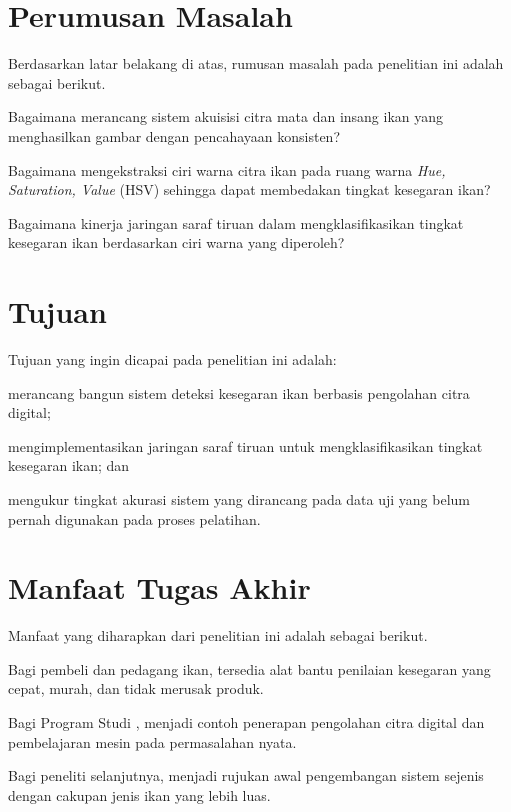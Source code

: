 \section{Perumusan Masalah}

Berdasarkan latar belakang di atas, rumusan masalah pada penelitian ini
adalah sebagai berikut.
\begin{packed_enum}
  \item Bagaimana merancang sistem akuisisi citra mata dan insang ikan
        yang menghasilkan gambar dengan pencahayaan konsisten?
  \item Bagaimana mengekstraksi ciri warna citra ikan pada ruang warna
        \textit{Hue, Saturation, Value} (HSV) sehingga dapat membedakan
        tingkat kesegaran ikan?
  \item Bagaimana kinerja jaringan saraf tiruan dalam mengklasifikasikan
        tingkat kesegaran ikan berdasarkan ciri warna yang diperoleh?
\end{packed_enum}

\section{Tujuan}

Tujuan yang ingin dicapai pada penelitian ini adalah:
\begin{packed_enum}
  \item merancang bangun sistem deteksi kesegaran ikan berbasis
        pengolahan citra digital;
  \item mengimplementasikan jaringan saraf tiruan untuk
        mengklasifikasikan tingkat kesegaran ikan; dan
  \item mengukur tingkat akurasi sistem yang dirancang pada data uji
        yang belum pernah digunakan pada proses pelatihan.
\end{packed_enum}

\section{Manfaat Tugas Akhir}

Manfaat yang diharapkan dari penelitian ini adalah sebagai berikut.
\begin{packed_enum}
  \item Bagi pembeli dan pedagang ikan, tersedia alat bantu penilaian
        kesegaran yang cepat, murah, dan tidak merusak produk.
  \item Bagi Program Studi \prodi, menjadi contoh penerapan pengolahan
        citra digital dan pembelajaran mesin pada permasalahan nyata.
  \item Bagi peneliti selanjutnya, menjadi rujukan awal pengembangan
        sistem sejenis dengan cakupan jenis ikan yang lebih luas.
\end{packed_enum}

